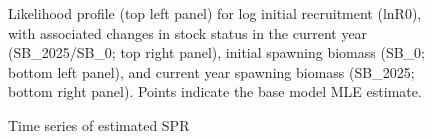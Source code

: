 \documentclass[
]{scrartcl}
\begin{document}
\begin{figure}


\caption{\label{fig-rzero-parm}Likelihood profile (top left panel) for
log initial recruitment (lnR0), with associated changes in stock status
in the current year (SB\_2025/SB\_0; top right panel), initial spawning
biomass (SB\_0; bottom left panel), and current year spawning biomass
(SB\_2025; bottom right panel). Points indicate the base model MLE
estimate.}

\end{figure}%

\clearpage

\begin{figure}


\caption{\label{fig-time-spr}Time series of estimated SPR}

\end{figure}%
\end{document}
